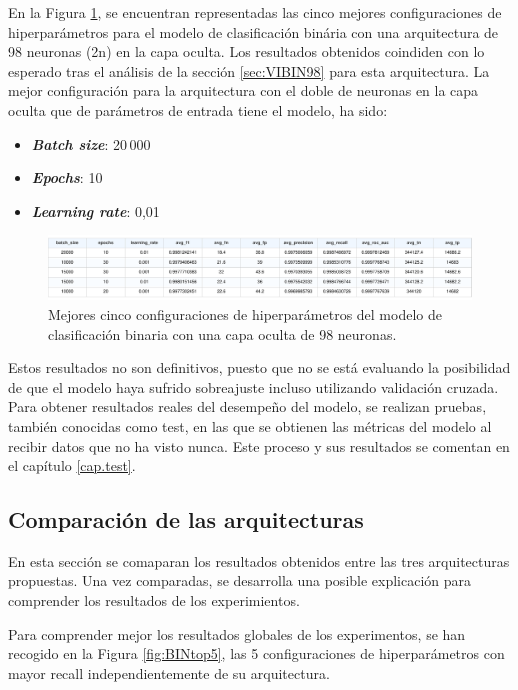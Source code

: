 En la Figura \ref{fig:BINhs98}, se encuentran representadas las cinco mejores configuraciones de hiperparámetros para el modelo de clasificación binária con una arquitectura de 98 neuronas (2n) en la capa oculta. Los resultados obtenidos coindiden con lo esperado tras el análisis de la sección \ref{sec:VIBIN98} para esta arquitectura. La mejor configuración para la arquitectura con el doble de neuronas en la capa oculta que de parámetros de entrada tiene el modelo, ha sido:
\begin{itemize}
	\item \textbf{\textit{Batch size}}: 20\,000
	\item \textbf{\textit{Epochs}}: 10
	\item \textbf{\textit{Learning rate}}: 0,01
\end{itemize}

\begin{figure}[H]
    \centering
    \includegraphics[width=1\textwidth]{./img/modelo/BINhs98.pdf}
    \caption{Mejores cinco configuraciones de hiperparámetros del modelo de clasificación binaria con una capa oculta de 98 neuronas.}
    \label{fig:BINhs98}
\end{figure}

Estos resultados no son definitivos, puesto que no se está evaluando la posibilidad de que el modelo haya sufrido sobreajuste incluso utilizando validación cruzada. Para obtener resultados reales del desempeño del modelo, se realizan pruebas, también conocidas como test, en las que se obtienen las métricas del modelo al recibir datos que no ha visto nunca. Este proceso y sus resultados se comentan en el capítulo \ref{cap.test}.


\subsection{Comparación de las arquitecturas} \label{sec:comp.BIN}
En esta sección se comaparan los resultados obtenidos entre las tres arquitecturas propuestas. Una vez comparadas, se desarrolla una posible explicación para comprender los resultados de los experimientos.

Para comprender mejor los resultados globales de los experimentos, se han recogido en la Figura \ref{fig:BINtop5}, las 5 configuraciones de hiperparámetros con mayor recall independientemente de su arquitectura.


